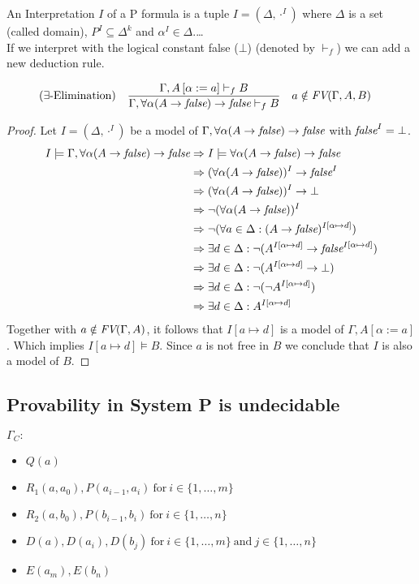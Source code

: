 An Interpretation $I$ of a P formula is a tuple $I=(\Delta,\cdot^I)$ where $\Delta$ is a set (called domain), $P^I\subseteq\Delta^k$ and $\alpha^I\in\Delta$.\dots\\
If we interpret \false{} with the logical constant false ($\bot$) (denoted by $\vdash_f$) we can add a new deduction rule.
\begin{mdframed}
\begin{align*}
&(\exists\text{-Elimination}) &&\frac
{\Gamma,A\left[\alpha:=a\right]\vdash_f B}
{\Gamma,\forall\alpha(A\to\emph{false})\to\emph{false}\vdash_f B} && a\notin\emph{FV}(\Gamma,A,B)
\end{align*}
\end{mdframed}
\begin{proof}
Let $I=(\Delta,\cdot^I)$ be a model of $\Gamma,\forall\alpha(A\to\emph{false})\to\emph{false}$ with $\emph{false}^I=\bot$.
\begin{align*}
I\models\Gamma,\forall\alpha(A\to\emph{false})\to\emph{false}&\Rightarrow I\models\forall\alpha(A\to\emph{false})\to\emph{false}\\
&\Rightarrow (\forall\alpha(A\to\emph{false}))^I\to\emph{false}^I\\
&\Rightarrow (\forall\alpha(A\to\emph{false}))^I\to\bot\\
&\Rightarrow \neg(\forall\alpha(A\to\emph{false}))^I\\
&\Rightarrow \neg(\forall a\in\Delta:(A\to\emph{false})^{I\left[\alpha\mapsto d\right]})\\
&\Rightarrow \exists d\in\Delta:\neg(A^{I\left[\alpha\mapsto d\right]}\to\emph{false}^{I\left[\alpha\mapsto d\right]})\\
&\Rightarrow \exists d\in\Delta:\neg(A^{I\left[\alpha\mapsto d\right]}\to\bot)\\
&\Rightarrow \exists d\in\Delta:\neg(\neg A^{I\left[\alpha\mapsto d\right]})\\
&\Rightarrow \exists d\in\Delta:A^{I\left[\alpha\mapsto d\right]}\\
\end{align*}
Together with $a\notin\emph{FV}(\Gamma,A)$, it follows that $I\left[a\mapsto d\right]$ is a model of $\Gamma,A\left[\alpha:=a\right]$. Which implies $I\left[a\mapsto d\right]\models B$.	Since $a$ is not free in $B$ we conclude that $I$ is also a model of $B$.
\end{proof}
\subsection{Provability in System P is undecidable}
$\Gamma_C:$
\begin{itemize}
\item $Q(a)$
\item $R_1(a,a_0),P(a_{i-1},a_i)~\text{for}~i\in\{1,\dots,m\}$
\item $R_2(a,b_0),P(b_{i-1},b_i)~\text{for}~i\in\{1,\dots,n\}$
\item $D(a),D(a_i),D(b_j)~\text{for}~i\in\{1,\dots,m\}~\text{and}~j\in\{1,\dots,n\}$
\item $E(a_m),E(b_n)$
\end{itemize}

